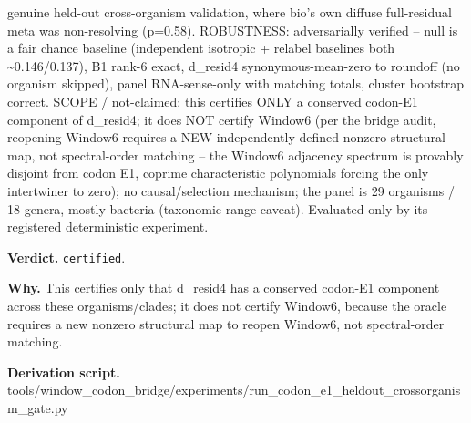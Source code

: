 genuine held-out cross-organism validation, where bio's own diffuse full-residual meta was
non-resolving (p=0.58). ROBUSTNESS: adversarially verified -- null is a fair chance baseline
(independent isotropic + relabel baselines both \textasciitilde{}0.146/0.137), B1 rank-6 exact,
d\_resid4 synonymous-mean-zero to roundoff (no organism skipped), panel RNA-sense-only with matching
totals, cluster bootstrap correct. SCOPE / not-claimed: this certifies ONLY a conserved codon-E1
component of d\_resid4; it does NOT certify Window6 (per the bridge audit, reopening Window6
requires a NEW independently-defined nonzero structural map, not spectral-order matching -- the
Window6 adjacency spectrum is provably disjoint from codon E1, coprime characteristic polynomials
forcing the only intertwiner to zero); no causal/selection mechanism; the panel is 29 organisms / 18
genera, mostly bacteria (taxonomic-range caveat). Evaluated only by its registered deterministic
experiment.

\textbf{Verdict.} \texttt{certified}.

\textbf{Why.} This certifies only that d\_resid4 has a conserved codon-E1 component across these organisms/clades;
it does not certify Window6, because the oracle requires a new nonzero structural map to reopen
Window6, not spectral-order matching.

\textbf{Derivation script.} tools/window\_codon\_bridge/experiments/run\_codon\_e1\_heldout\_crossorganism\_gate.py

